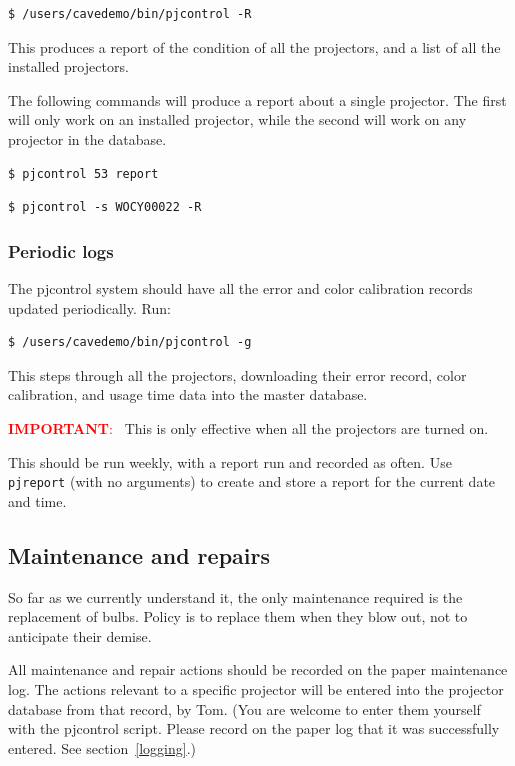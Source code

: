\documentclass[11pt]{article}
\newenvironment{note}[1][Note]{\begin{lrbox}{\notebox}%
    \begin{minipage}{0.9\columnwidth}\textcolor{red}{\textbf{#1}:~}}%
    {\end{minipage}\end{lrbox}\begin{center}\setlength{\fboxsep}{8pt}%
    \fbox{\usebox{\notebox}}\end{center}}
\newcommand{\cmd}[1]{\texttt{#1}}
\begin{document}
\begin{verbatim}
$ /users/cavedemo/bin/pjcontrol -R
\end{verbatim}

This produces a report of the condition of all the projectors, and a
list of all the installed projectors.

The following commands will produce a report about a single
projector.  The first will only work on an installed projector, while
the second will work on any projector in the database.

\begin{verbatim}
$ pjcontrol 53 report
\end{verbatim}

\begin{verbatim}
$ pjcontrol -s WOCY00022 -R
\end{verbatim}

\subsubsection{Periodic logs}

The pjcontrol system should have all the error and color calibration
records updated periodically.  Run:

\begin{verbatim}
$ /users/cavedemo/bin/pjcontrol -g
\end{verbatim}

This steps through all the projectors, downloading their error
record, color calibration, and usage time data into the master
database.

\begin{note}[IMPORTANT]
This is only effective when all the projectors are turned on.
\end{note}

This should be run weekly, with a report run and recorded as often.
Use \cmd{pjreport} (with no arguments) to create and store a report for
the current date and time.

\subsection{Maintenance and repairs}

So far as we currently understand it, the only maintenance required is
the replacement of bulbs.  Policy is to replace them when they blow
out, not to anticipate their demise.

All maintenance and repair actions should be recorded on the paper
maintenance log.  The actions relevant to a specific projector will be
entered into the projector database from that record, by Tom.  (You
are welcome to enter them yourself with the pjcontrol script.  Please
record on the paper log that it was successfully entered.  See
section~\ref{logging}.) 
\end{document}
